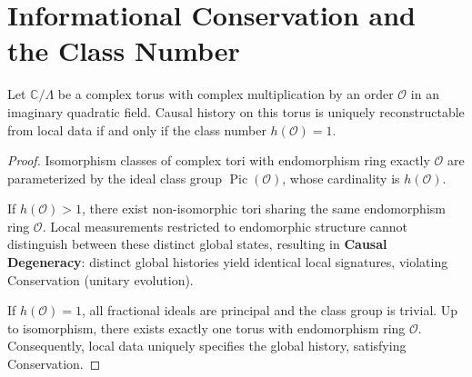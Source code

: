 \section{Informational Conservation and the Class Number}
\label{app:unitarity-class-number}

\begin{theorem}
Let $\mathbb{C}/\Lambda$ be a complex torus with complex multiplication by an order $\mathcal{O}$ in an imaginary quadratic field. Causal history on this torus is uniquely reconstructable from local data if and only if the class number $h(\mathcal{O}) = 1$.
\end{theorem}

\begin{proof}
Isomorphism classes of complex tori with endomorphism ring exactly $\mathcal{O}$ are parameterized by the ideal class group $\operatorname{Pic}(\mathcal{O})$, whose cardinality is $h(\mathcal{O})$.

If $h(\mathcal{O}) > 1$, there exist non-isomorphic tori sharing the same endomorphism ring $\mathcal{O}$. Local measurements restricted to endomorphic structure cannot distinguish between these distinct global states, resulting in \textbf{Causal Degeneracy}: distinct global histories yield identical local signatures, violating Conservation (unitary evolution).

If $h(\mathcal{O}) = 1$, all fractional ideals are principal and the class group is trivial. Up to isomorphism, there exists exactly one torus with endomorphism ring $\mathcal{O}$. Consequently, local data uniquely specifies the global history, satisfying Conservation.
\end{proof}